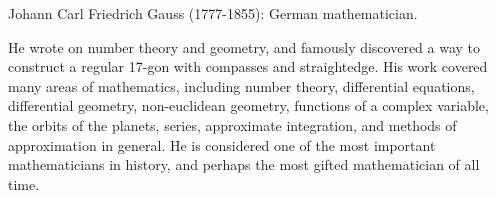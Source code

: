 Johann Carl Friedrich Gauss (1777-1855): German mathematician.
\par
He wrote on number theory and geometry, and famously discovered a way to
construct a regular 17-gon with compasses and straightedge. His work 
covered many areas of mathematics, including number theory, differential equations, differential geometry, non-euclidean geometry, functions of a complex variable,  
 the orbits of the planets, series, approximate integration,
and methods of approximation in general. He is considered one of the
most important mathematicians in history, and perhaps the most gifted mathematician
of all time.